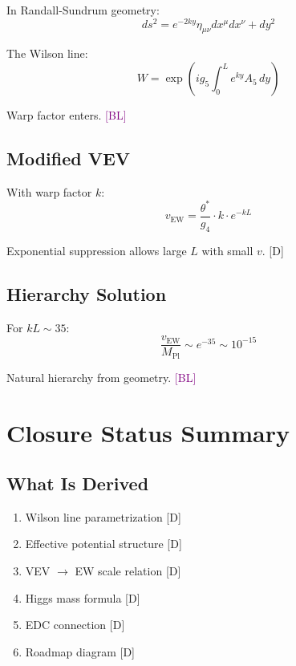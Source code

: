 \documentclass[11pt,a4paper]{article}
\newcommand{\tagD}{\textcolor{blue!70!black}{[D]}}
\newcommand{\tagBL}{\textcolor{purple}{[BL]}}
\begin{document}
In Randall-Sundrum geometry:
\begin{equation}
\label{eq:rs-metric}
ds^2 = e^{-2ky} \eta_{\mu\nu} dx^\mu dx^\nu + dy^2
\end{equation}

The Wilson line:
\begin{equation}
\label{eq:wilson-warped}
W = \exp\left(ig_5 \int_0^L e^{ky} A_5 \, dy\right)
\end{equation}

Warp factor enters. \tagBL

\subsection{Modified VEV}

With warp factor $k$:
\begin{equation}
\label{eq:v-warped}
v_{\text{EW}} = \frac{\theta^*}{g_4} \cdot k \cdot e^{-kL}
\end{equation}

Exponential suppression allows large $L$ with small $v$. \tagD

\subsection{Hierarchy Solution}

For $kL \sim 35$:
\begin{equation}
\label{eq:hierarchy}
\frac{v_{\text{EW}}}{M_{\text{Pl}}} \sim e^{-35} \sim 10^{-15}
\end{equation}

Natural hierarchy from geometry. \tagBL

\section{Closure Status Summary}

\subsection{What Is Derived}

\begin{enumerate}
    \item Wilson line parametrization \tagD
    \item Effective potential structure \tagD
    \item VEV $\to$ EW scale relation \tagD
    \item Higgs mass formula \tagD
    \item EDC connection \tagD
    \item Roadmap diagram \tagD
\end{enumerate}
\end{document}
